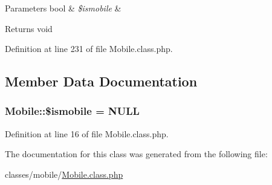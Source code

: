 \begin{DoxyParams}[1]{Parameters}
bool & {\em \$ismobile} & \\
\hline
\end{DoxyParams}
\begin{DoxyReturn}{Returns}
void 
\end{DoxyReturn}


Definition at line 231 of file Mobile.\+class.\+php.



\subsection{Member Data Documentation}
\hypertarget{classMobile_a321b198b13267ac948fb78b6dc09de4e}{
\subsubsection[{\$ismobile}]{\setlength{\rightskip}{0pt plus 5cm}Mobile\+::\$ismobile = N\+U\+L\+L}}\label{classMobile_a321b198b13267ac948fb78b6dc09de4e}


Definition at line 16 of file Mobile.\+class.\+php.



The documentation for this class was generated from the following file\+:\begin{DoxyCompactItemize}
\item 
classes/mobile/\hyperlink{classes_2mobile_2mobile_8class_8php}{Mobile.\+class.\+php}\end{DoxyCompactItemize}
